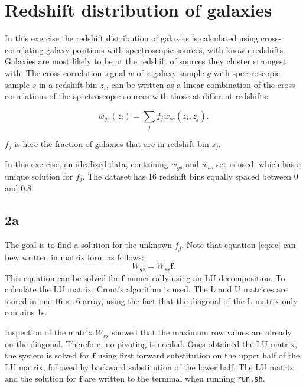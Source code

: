 \section{Redshift distribution of galaxies}
In this exercise the redshift distribution of galaxies is calculated using cross-correlating galaxy positions with spectroscopic sources, with known redshifts. Galaxies are most likely to be at the redshift of sources they cluster strongest with. The cross-correlation signal $w$ of a galaxy sample $g$ with spectroscopic sample $s$ in a redshift bin $z_i$, can be written as a linear combination of the cross-correlations of the spectroscopic sources with those at different redshifts:

\begin{equation}
    \label{eq:cc}
    w_{gs}(z_i) = \sum_j f_j w_{ss}(z_i, z_j).
\end{equation}

$f_j$ is here the fraction of galaxies that are in redshift bin $z_j$. 

In this exercise, an idealized data, containing $w_{gs}$ and $w_{ss}$ set is used, which has a unique solution for $f_j$. The dataset has 16 redshift bins equally spaced between 0 and 0.8. 

\subsection*{2a}
The goal is to find a solution for the unknown $f_j$. Note that equation \ref{eq:cc} can bew written in matrix form as follows:
\begin{equation}
    W_{gs} = W_{ss}\mathbf{f}.
\end{equation}
This equation can be solved for $\mathbf{f}$ numerically using an LU decomposition. To calculate the LU matrix, Crout's algorithm is used. The L and U matrices are stored in one $16 \times 16$ array, using the fact that the diagonal of the L matrix only contains 1s.

Inspection of the matrix $W_{ss}$ showed that the maximum row values are already on the diagonal. Therefore, no pivoting is needed. Ones obtained the LU matrix, the system is solved for $\mathbf{f}$ using first forward substitution on the upper half of the LU matrix, followed by backward substitution of the lower half. The LU matrix and the solution for $\mathbf{f}$ are written to the terminal when running \texttt{run.sh}.

